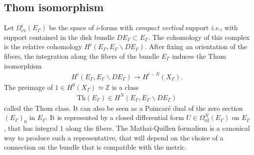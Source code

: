 \documentclass[a4paper,11pt]{amsart} %
\newcommand{\8}{\infty}
\newcommand{\Z}{\mathbb{Z}}
\newcommand{\Th}{\mathrm{Th}}
\newcommand{\rd}{\textrm{rd}}
\newcommand{\cv}{\textrm{cv}}
\theoremstyle{mytheoremstyle}
\theoremstyle{remark}
\numberwithin{equation}{section}
\begin{document}
\subsection{Thom isomorphism} \label{subsec: thom iso}
Let $\Omega_{\cv}^i(E_\Gamma)$ be the space of $i$-forms with {\em compact vertical} support {\em i.e.}, with support contained in the disk bundle $DE_\Gamma \subset E_\Gamma$. The cohomology of this complex is the relative cohomology $H^i(E_\Gamma,E_\Gamma \smallsetminus DE_\Gamma)$. 
After fixing an orientation of the fibers, the integration along the fibers of the bundle $E_\Gamma$ induces the Thom isomorphism
\begin{align}
    H^i(E_\Gamma,E_\Gamma \smallsetminus DE_\Gamma) \longrightarrow H^{i-N}(X_\Gamma).
\end{align}
The preimage of $1 \in H^0(X_\Gamma)\simeq \Z$ is a class
\begin{align}
    \Th(E_\Gamma) \in H^N(E_\Gamma,E_\Gamma \smallsetminus DE_\Gamma)
\end{align}
called the Thom class. It can also be seen as a Poincaré dual of the zero section $(E_\Gamma)_0$ in $E_\Gamma$. It is represented by a closed differential form $U \in \Omega^{N}_\rd(E_\Gamma)$ on $E_\Gamma$, that has integral $1$ along the fibers. The Mathai-Quillen formalism is a canonical way to produce such a representative, that will depend on the choice of a connection on the bundle that is compatible with the metric. 

\end{document}
